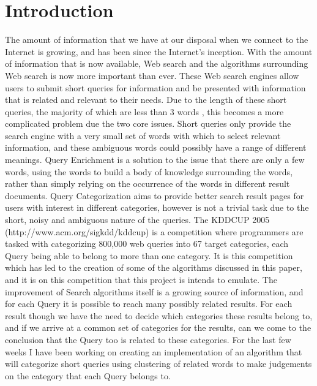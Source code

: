 \documentclass[letterpaper]{article}
\begin{document}
\section{Introduction}
The amount of information that we have at our disposal when we connect to the Internet is growing, and has been since the Internet's inception. With the amount of information that is now available, Web search and the algorithms surrounding Web search is now more important than ever. These Web search engines allow users to submit short queries for information and be presented with information that is related and relevant to their needs. Due to the length of these short queries, the majority of which are less than 3 words \cite{holscher2000web}, this becomes a more complicated problem due the two core issues. 
Short queries only provide the search engine with a very small set of words with which to select relevant information, and these ambiguous words could possibly have a range of different meanings.  Query Enrichment is a solution to the issue that there are only a few words, using the words to build a body of knowledge surrounding the words, rather than simply relying on the occurrence of the words in different result documents. Query Categorization aims to provide better search result pages for users with interest in different categories, however is not a trivial task due to the short, noisy and ambiguous nature of the queries. The KDDCUP 2005 (http://www.acm.org/sigkdd/kddcup) is a competition where programmers are tasked with categorizing 800,000 web queries into 67 target categories, each Query being able to belong to more than one category. It is this competition which has led to the creation of some of the algorithms discussed in this paper, and it is on this competition that this project is intends to emulate.
The improvement of Search algorithms itself is a growing source of information, and for each Query it is possible to reach many possibly related results. For each result though we have the need to decide which categories these results belong to, and if we arrive at a common set of categories for the results, can we come to the conclusion that the Query too is related to these categories.
For the last few weeks I have been working on creating an implementation of an algorithm that will categorize short queries using clustering of related words to make judgements on the category that each Query belongs to. 
\end{document}
